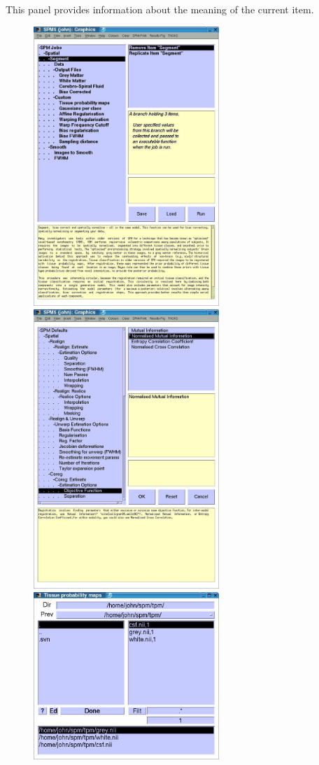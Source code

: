 \documentclass[a4paper,titlepage]{book}
\begin{document}
This panel provides information about the meaning of the current item.

\begin{figure}
\begin{center}
\includegraphics[width=70mm]{images/ui1}
\includegraphics[width=70mm]{images/ui2}
\includegraphics[width=70mm]{images/ui3}

\end{center}
\end{figure}
\end{document}
